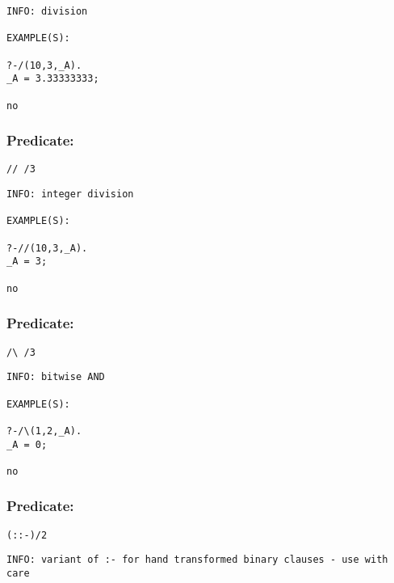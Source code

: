 {\small \begin{verbatim}
INFO: division

EXAMPLE(S):

?-/(10,3,_A).
_A = 3.33333333;

no

\end{verbatim}}

\subsubsection{Predicate:} \label{V47WV47WV95W3}

\begin{verbatim}
// /3
\end{verbatim}

{\small \begin{verbatim}
INFO: integer division

EXAMPLE(S):

?-//(10,3,_A).
_A = 3;

no

\end{verbatim}}

\subsubsection{Predicate:} \label{V47WV92WV95W3}

\begin{verbatim}
/\ /3
\end{verbatim}

{\small \begin{verbatim}
INFO: bitwise AND

EXAMPLE(S):

?-/\(1,2,_A).
_A = 0;

no

\end{verbatim}}

\subsubsection{Predicate:} \label{V58WV58WV45WV95W2}

\begin{verbatim}
(::-)/2
\end{verbatim}

{\small \begin{verbatim}
INFO: variant of :- for hand transformed binary clauses - use with care

\end{verbatim}}

